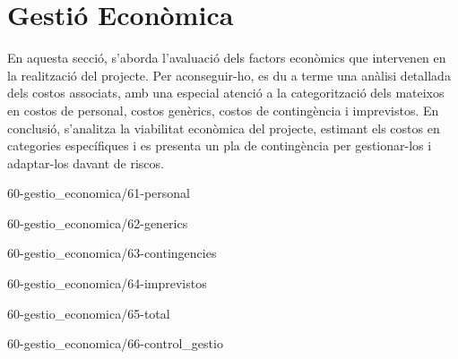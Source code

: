 \chapter{Gestió Econòmica}
En aquesta secció, s'aborda l'avaluació dels factors econòmics que intervenen en la realització del projecte. Per aconseguir-ho, es du a terme una anàlisi detallada dels costos associats, amb una especial atenció a la categorització dels mateixos en costos de personal, costos genèrics, costos de contingència i imprevistos. En conclusió, s'analitza la viabilitat econòmica del projecte, estimant els costos en categories específiques i es presenta un pla de contingència per gestionar-los i adaptar-los davant de riscos.

{60-gestio_economica/61-personal}

{60-gestio_economica/62-generics}

{60-gestio_economica/63-contingencies}

{60-gestio_economica/64-imprevistos}

{60-gestio_economica/65-total}

{60-gestio_economica/66-control_gestio}
